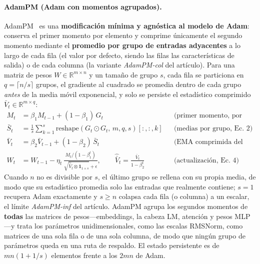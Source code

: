 \paragraph{AdamPM (Adam con momentos agrupados).}
AdamPM~\citep{ji_adampm_2026} es una \textbf{modificación mínima y agnóstica al
modelo de Adam}: conserva el primer momento por elemento y comprime únicamente
el segundo momento mediante el \textbf{promedio por grupo de entradas
adyacentes} a lo largo de cada fila (el valor por defecto, siendo las filas las
características de salida) o de cada columna (la variante \emph{AdamPM-col} del
artículo). Para una matriz de pesos $W \in \mathbb{R}^{m \times n}$ y un tamaño
de grupo $s$, cada fila se particiona en $q = \lceil n/s \rceil$ grupos, el
gradiente al cuadrado se promedia dentro de cada grupo \emph{antes} de la media
móvil exponencial, y solo se persiste el estadístico comprimido
$\bar{V}_t \in \mathbb{R}^{m \times q}$:
\begin{align}
M_t &= \beta_1 M_{t-1} + (1-\beta_1)\, G_t
     && \text{(primer momento, por elemento, Ec.~1)} \\
\bar{S}_t &= \frac{1}{s}\sum_{k=1}^{s}
     \mathrm{reshape}(G_t \odot G_t,\, m, q, s)[:,:,k]
     && \text{(medias por grupo, Ec.~2)} \\
\bar{V}_t &= \beta_2 \bar{V}_{t-1} + (1-\beta_2)\, \bar{S}_t
     && \text{(EMA comprimida del segundo momento, Ec.~3)} \\
W_t &= W_{t-1} - \eta_t \,
     \frac{M_t/(1-\beta_1^t)}
          {\sqrt{\hat{\bar{V}}_t \otimes \mathbf{1}_{1\times s}} + \epsilon},
\qquad \hat{\bar{V}}_t = \frac{\bar{V}_t}{1-\beta_2^t}
     && \text{(actualización, Ec.~4)}
\end{align}
Cuando $n$ no es divisible por $s$, el último grupo se rellena con su propia
media, de modo que su estadístico promedia solo las entradas que realmente
contiene; $s{=}1$ recupera Adam exactamente y $s \ge n$ colapsa cada fila (o
columna) a un escalar, el límite \emph{AdamPM-inf} del artículo. AdamPM agrupa
los segundos momentos de \textbf{todas} las matrices de pesos---embeddings, la
cabeza LM, atención y pesos MLP---y trata los parámetros unidimensionales, como
las escalas RMSNorm, como matrices de una sola fila o de una sola columna, de
modo que ningún grupo de parámetros queda en una ruta de respaldo. El estado
persistente es de $mn(1+1/s)$ elementos frente a los $2mn$ de Adam.

